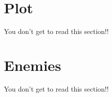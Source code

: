 \documentclass[letterpaper,12pt]{article}
\begin{document}
\section{Plot}\label{Plot}

You don't get to read this section!!

\section{Enemies}\label{Enemies}

You don't get to read this section!!
   
\begin{comment}
\begin{figure}[ht] 
        \centering \texttt{[image: sr\_setup]}
        \caption{
                \label{fig:samplesetup} %
                Every figure MUST have a caption.
        }
\end{figure}

\begin{table}[ht]
\begin{center}
\caption{Every table needs a caption.}
\label{tbl:bins} %
\begin{tabular}{|cc|} 
\hline
\multicolumn{1}{|c}{$x$ (m)} & \multicolumn{1}{c|}{$V$ (V)} \\
\hline
0.0044151 &   0.0030871 \\
0.0021633 &   0.0021343 \\
0.0003600 &   0.0018642 \\
0.0023831 &   0.0013287 \\
\hline
\end{tabular}
\end{center}
\end{table}

\end{comment}
\end{document}
